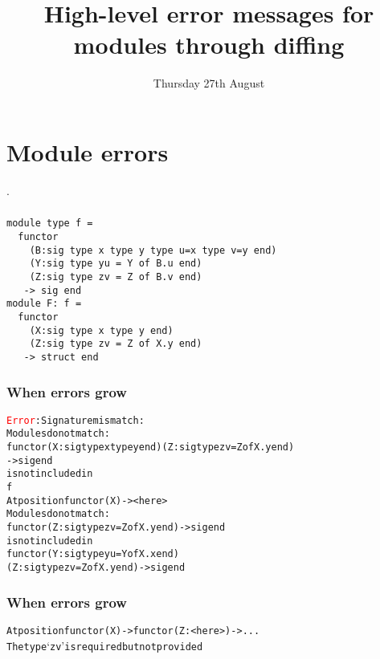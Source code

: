 \documentclass[a4paper,11pt]{beamer}
\title[Functor diffing]{High-level error messages for modules through diffing}
\author[Angeletti \& Radanne]{\texorpdfstring{
  \begin{columns}\column{0.5\linewidth}\centering%
  Florian \textsc{Angeletti}\\
  Inria\\
  \href{mailto:florian.angeletti@inria.fr}
  {\nolinkurl{florian.angeletti@inria.fr}}
  \column{0.5\linewidth}\centering%
  Gabriel \textsc{Radanne}\\
  Inria\\
  \href{mailto:gabriel.radanne@inria.fr}
  {\nolinkurl{gabriel.radanne@inria.fr}}
  \end{columns}
  }{F. Angeletti \& G. Radanne}}
\date{Thursday 27th August}
\newcommand{\error}[1]{\textcolor{red}{#1}}
\begin{document}
\begin{frame}
\maketitle
\end{frame}

\section{Module errors}

\begin{frame}
  .
\end{frame}

\begin{frame}[fragile]\frametitle{}

\begin{verbatim}
module type f =
  functor
    (B:sig type x type y type u=x type v=y end)
    (Y:sig type yu = Y of B.u end)
    (Z:sig type zv = Z of B.v end)
   -> sig end
module F: f =
  functor
    (X:sig type x type y end)
    (Z:sig type zv = Z of X.y end)
   -> struct end
\end{verbatim}

\end{frame}

\begin{frame}[fragile]\frametitle{When errors grow}

\begin{alltt}\error{Error}: Signature mismatch:
       Modules do not match:
         functor (X : sig type x type y end) (Z : sig type zv = Z of X.y end)
           -> sig end
       is not included in
         f
       At position functor (X) -> <here>
       Modules do not match:
         functor (Z : sig type zv = Z of X.y end) -> sig end
       is not included in
         functor (Y : sig type yu = Y of X.x end)
           (Z : sig type zv = Z of X.y end) -> sig end
\end{alltt}

\end{frame}

\begin{frame}[fragile]\frametitle{When errors grow}

\begin{alltt}
       At position functor (X) -> functor (Z : <here>) -> ...
       The type `zv' is required but not provided
\end{alltt}

\end{frame}
\end{document}
